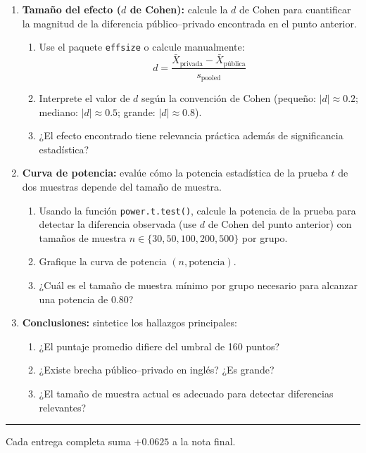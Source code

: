 \documentclass[11pt, a4paper]{article}
\begin{document}
\begin{enumerate}[label=\arabic*)]
  \item \textbf{Tama\~no del efecto ($d$ de Cohen):} calcule la $d$ de Cohen
        para cuantificar la magnitud de la diferencia p\'ublico--privado
        encontrada en el punto anterior.
        \begin{enumerate}[label=\alph*)]
          \item Use el paquete \texttt{effsize} o calcule manualmente:
                \[
                  d = \frac{\bar{X}_{\text{privada}} - \bar{X}_{\text{p\'ublica}}}
                           {s_{\text{pooled}}}
                \]
          \item Interprete el valor de $d$ seg\'un la convenci\'on de Cohen
                (peque\~no: $|d| \approx 0.2$; mediano: $|d| \approx 0.5$;
                grande: $|d| \approx 0.8$).
          \item ¿El efecto encontrado tiene relevancia pr\'actica adem\'as de
                significancia estad\'istica?
        \end{enumerate}

  \item \textbf{Curva de potencia:} eval\'ue c\'omo la potencia estad\'istica
        de la prueba $t$ de dos muestras depende del tama\~no de muestra.
        \begin{enumerate}[label=\alph*)]
          \item Usando la funci\'on \texttt{power.t.test()}, calcule la
                potencia de la prueba para detectar la diferencia observada
                (use $d$ de Cohen del punto anterior) con tama\~nos de muestra
                $n \in \{30, 50, 100, 200, 500\}$ por grupo.
          \item Grafique la curva de potencia $(n, \text{potencia})$.
          \item ¿Cu\'al es el tama\~no de muestra m\'inimo por grupo necesario
                para alcanzar una potencia de 0.80?
        \end{enumerate}

  \item \textbf{Conclusiones:} sintetice los hallazgos principales:
        \begin{enumerate}[label=\alph*)]
          \item ¿El puntaje promedio difiere del umbral de 160 puntos?
          \item ¿Existe brecha p\'ublico--privado en ingl\'es? ¿Es grande?
          \item ¿El tama\~no de muestra actual es adecuado para detectar
                diferencias relevantes?
        \end{enumerate}
\end{enumerate}

\vspace{10pt}
\rule{\linewidth}{0.4pt}
\begin{center}
{\small Cada entrega completa suma $+0.0625$ a la nota final.}
\end{center}
\end{document}
